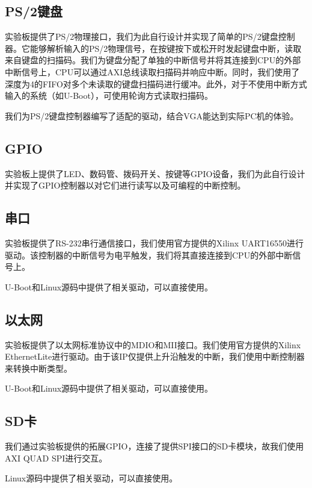 \subsection{PS/2键盘}

实验板提供了PS/2物理接口，我们为此自行设计并实现了简单的PS/2键盘控制器。它能够解析输入的PS/2物理信号，在按键按下或松开时发起键盘中断，读取来自键盘的扫描码。我们为键盘分配了单独的中断信号并将其连接到CPU的外部中断信号上，CPU可以通过AXI总线读取扫描码并响应中断。同时，我们使用了深度为4的FIFO对多个未读取的键盘扫描码进行缓冲。此外，对于不使用中断方式输入的系统（如U-Boot），可使用轮询方式读取扫描码。	

我们为PS/2键盘控制器编写了适配的驱动，结合VGA能达到实际PC机的体验。

\subsection{GPIO}
实验板上提供了LED、数码管、拨码开关、按键等GPIO设备，我们为此自行设计并实现了GPIO控制器以对它们进行读写以及可编程的中断控制。

\subsection{串口}
实验板提供了RS-232串行通信接口，我们使用官方提供的Xilinx UART16550进行驱动。该控制器的中断信号为电平触发，我们将其直接连接到CPU的外部中断信号上。

U-Boot和Linux源码中提供了相关驱动，可以直接使用。

\subsection{以太网}
实验板提供了以太网标准协议中的MDIO和MII接口。我们使用官方提供的Xilinx EthernetLite进行驱动。由于该IP仅提供上升沿触发的中断，我们使用中断控制器来转换中断类型。

U-Boot和Linux源码中提供了相关驱动，可以直接使用。

\subsection{SD卡}
我们通过实验板提供的拓展GPIO，连接了提供SPI接口的SD卡模块，故我们使用AXI QUAD SPI进行交互。

Linux源码中提供了相关驱动，可以直接使用。